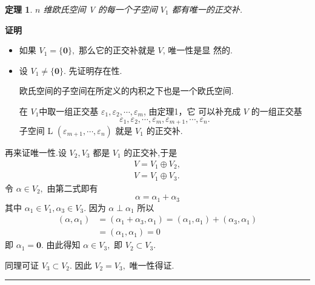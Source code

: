 \documentclass[13pt]{beamer}
\newtheorem{thm}{定理}
\def\qed{\nopagebreak\hfill{\rule{4pt}{7pt}}\medbreak}
\def\pf{{\bf 证明~~ }}
\def\0{\mathbf{0}}
\begin{document}
\begin{frame}
\begin{thm}
$n$ 维欧氏空间 V 的每一个子空间 $V_{1}$ 都有唯一的正交补. 
\end{thm}
\pf 
\begin{itemize}
\item 如果 $V_{1}=\{{\0}\},$ 那么它的正交补就是 $V$, 唯一性是显
然的.

\item 设 $V_{1} \neq\{{\0}\} .$
先证明存在性.

 欧氏空间的子空间在所定义的内积之下也是一个欧氏空间.

在 $V_1$中取一组正交基 ${\varepsilon}_{1}, {\varepsilon}_{2}, \cdots, {\varepsilon}_{m}$, 由定理1，它
可以补充成 $V$ 的一组正交基
\[
{\varepsilon}_{1}, {\varepsilon}_{2}, \cdots, {\varepsilon}_{m}, {\varepsilon}_{m+1}, \cdots, {\varepsilon}_{n}.
\]
子空间 L $\left({\varepsilon}_{m+1}, \cdots, {\varepsilon}_{n}\right)$ 就是 $V_{1}$ 的正交补.
\end{itemize}



\end{frame}


\begin{frame}
再来证唯一性.设 $V_{2}, V_{3}$ 都是 $V_{1}$ 的正交补,于是
\[
\begin{array}{l}
V=V_{1} \oplus V_{2}, \\
V=V_{1} \oplus V_{3}.
\end{array}
\]
令 ${\alpha} \in V_{2},$ 由第二式即有
\[
{\alpha}={\alpha}_{1}+{\alpha}_{3}
\]
其中 ${\alpha}_{1} \in V_{1}, {\alpha}_{3} \in V_{3} .$ 因为 ${\alpha} \perp {\alpha}_{1}$ 所以
\[
\begin{aligned}
\left({\alpha}, {\alpha}_{1}\right) &=\left({\alpha}_{1}+{\alpha}_{3}, {\alpha}_{1}\right)=\left({\alpha}_{1}, {a}_{1}\right)+\left({\alpha}_{3}, {\alpha}_{1}\right) \\
&=\left({\alpha}_{1}, {\alpha}_{1}\right)=0
\end{aligned}
\]
即 ${\alpha}_{1}={\0}$. 
由此得知 ${\alpha} \in V_{3},$ 即 $V_{2} \subset V_{3}$.

同理可证 $V_{3} \subset V_{2} .$ 因此 $V_{2}=V_{3},$ 唯一性得证. 
\qed

\end{frame}
\end{document}
